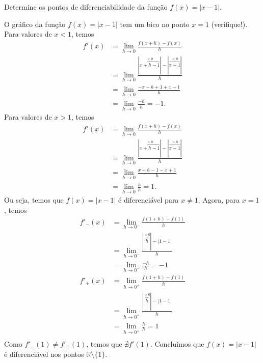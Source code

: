 \begin{exeresol}
  Determine os pontos de diferenciabilidade da função $f(x) = |x-1|$.
\end{exeresol}
\begin{resol}
  O gráfico da função $f(x) = |x-1|$ tem um bico no ponto $x=1$ (verifique!). Para valores de $x<1$, temos
  \begin{align}
    f'(x) &= \lim_{h\to 0} \frac{f(x+h) - f(x)}{h}\\
          &= \lim_{h\to 0} \frac{|\overbrace{x+h-1}^{<0}| - |\overbrace{x-1}^{<0}|}{h}\\
          &= \lim_{h\to 0} \frac{-x-h+1+x-1}{h}\\
          &= \lim_{h\to 0} \frac{-h}{h} = -1.
  \end{align}
  Para valores de $x > 1$, temos
  \begin{align}
    f'(x) &= \lim_{h\to 0} \frac{f(x+h) - f(x)}{h}\\
          &= \lim_{h\to 0} \frac{|\overbrace{x+h-1}^{>0}| - |\overbrace{x-1}^{>0}|}{h}\\
          &= \lim_{h\to 0} \frac{x+h-1-x+1}{h}\\
          &= \lim_{h\to 0} \frac{h}{h} = 1.
  \end{align}
  Ou seja, temos que $f(x) = |x-1|$ é diferenciável para $x\neq 1$. Agora, para $x=1$, temos
  \begin{align}
    f'_{-}(x) &= \lim_{h\to 0^{-}} \frac{f(1+h) - f(1)}{h}\\
              &= \lim_{h\to 0^{-}} \frac{|\overbrace{h}^{<0}| - |1-1|}{h}\\
              &= \lim_{h\to 0^{-}} \frac{-h}{h} = -1\\
    f'_{+}(x) &= \lim_{h\to 0^{+}} \frac{f(1+h) - f(1)}{h}\\
          &= \lim_{h\to 0^{+}} \frac{|\overbrace{h}^{>0}| - |1-1|}{h}\\
              &= \lim_{h\to 0^{+}} \frac{h}{h} = 1\\
  \end{align}
  Como $f'_{-}(1)\neq f'_{+}(1)$, temos que $\nexists f'(1)$. Concluímos que $f(x) = |x-1|$ é diferenciável nos pontos $\mathbb{R}\setminus\{1\}$. 
\end{resol}

